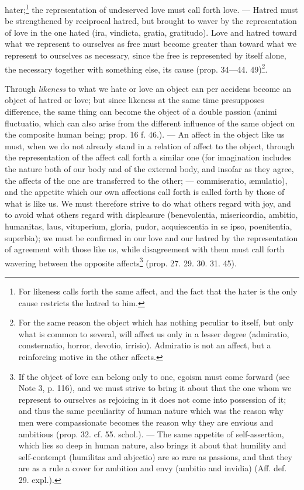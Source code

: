 \documentclass[12pt,a4paper,openany]{book}
\newcommand{\opage}[1]{\marginnote{\footnotesize\textit{[#1]}}}
\begin{document}
hater;\footnote{For likeness calls forth the same
affect, and the fact that the hater is the only cause
restricts the hatred to him.} the representation of undeserved love must call forth
love. --- Hatred must be strengthened by reciprocal hatred,
but brought to waver by the representation of love
in the one hated (ira, vindicta, gratia, gratitudo). Love
and hatred toward what we represent to ourselves as free must
become greater than toward what we represent to ourselves as necessary,
since the free is represented by itself alone, the necessary together
with something else, its
cause (prop. 34---44.
49)\footnote{For the same reason the object which has
nothing peculiar to itself, but only what is common to several, will affect us only
in a lesser degree (admiratio, consternatio, horror,
devotio, irrisio). Admiratio is not an affect, but a
reinforcing motive in the other affects.}.

Through \emph{likeness} to what we hate or love
an object can per accidens become an object of hatred or
love; but since likeness at the same time presupposes difference,
the same thing can become the object of a double
passion (animi fluctuatio, which can also arise from the
different influence of the same object on the composite human being;
prop. 16 f. 46.). --- An affect
in the object like us must, when we do not already
stand in a relation of affect to the object, through the representation
of the affect call forth a similar one (for imagination
includes the nature both of our body and of the external body,
and insofar as they agree, the affects of the one are transferred to
the other; --- commiseratio, æmulatio), and the appetite which
\opage{118}\setcounter{footnote}{0}our own affections call forth is called forth by those of what is
like us. We must therefore strive to do what
others regard with joy, and to avoid what others
regard with displeasure (benevolentia, misericordia, ambitio,
humanitas, laus, vituperium, gloria, pudor, acquiescentia in
se ipso, poenitentia, superbia); we must be confirmed in our
love and our hatred by the representation of agreement
with those like us, while disagreement
with them must call forth wavering between the opposite
affects\footnote{If the object of love can belong only to
one, egoism must come forward (see Note 3, p. 116), and
we must strive to bring it about that the one whom we represent to ourselves
as rejoicing in it does not come into possession of it; and
thus the same peculiarity of
human nature which was the reason why men
were compassionate becomes the reason why they are envious and
ambitious (prop. 32. cf. 55. schol.). --- The same
appetite of self-assertion, which lies so deep in human
nature, also brings it about that humility and self-contempt (humilitas
and abjectio) are so rare as passions, and that they are as a
rule a cover for ambition and envy
(ambitio and invidia) (Aff. def. 29. expl.).} (prop. 27. 29. 30. 31. 45).
\end{document}
